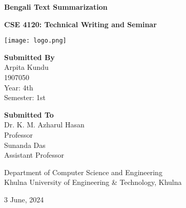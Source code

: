 \documentclass[12pt]{report}
\begin{document}
\justifying  %

\begin{titlepage}
    \centering

    \Huge
    \textbf{Bengali Text Summarization}

    \vspace{1cm}
    \LARGE
    \textbf{CSE 4120: Technical Writing and Seminar}

    \vspace{1cm}

    \texttt{[image: logo.png]} %

    \vspace{2cm}

    \begin{minipage}[t]{0.45\textwidth}
        \centering
        \textbf{\Large Submitted By} \\
        \vspace{0.25cm}
        \large Arpita Kundu \\
        1907050 \\
        Year: 4th \\
        Semester: 1st
    \end{minipage}
    \hfill
    \begin{minipage}[t]{0.45\textwidth}
        \centering
        \textbf{\Large Submitted To} \\
        \vspace{0.25cm}
        \large Dr. K. M. Azharul Hasan \\
        Professor \\
        \vspace{0.25cm}
        \large Sunanda Das \\
        Assistant Professor \\
    \end{minipage}

    \vfill

    \large Department of Computer Science and Engineering \\
    Khulna University of Engineering \& Technology, Khulna \\

    \vspace{0.5cm}

    \large 3 June, 2024
\end{titlepage}

\begingroup
\let\clearpage\relax
\tableofcontents
\vspace{1cm}
\listoffigures
\vspace{1cm}
\listoftables
\endgroup
\newpage
\end{document}
